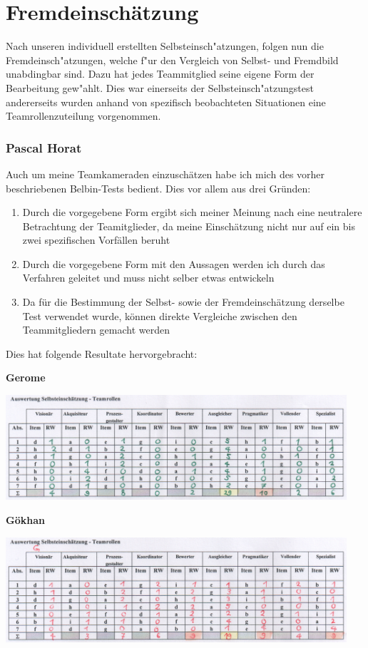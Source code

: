 
\chapter{Fremdeinschätzung}
Nach unseren individuell erstellten Selbsteinsch"atzungen, folgen nun die Fremdeinsch"atzungen, welche f"ur
den Vergleich von Selbst- und Fremdbild unabdingbar sind.
Dazu hat jedes Teammitglied seine eigene Form der Bearbeitung gew"ahlt. Dies war einerseits der Selbsteinsch"atzungstest andererseits wurden anhand von spezifisch beobachteten Situationen eine Teamrollenzuteilung
vorgenommen.
\subsection*{Pascal Horat}

Auch um meine Teamkameraden einzuschätzen habe ich mich des vorher beschriebenen Belbin-Tests bedient. Dies vor allem aus drei Gründen:
\begin{enumerate}
\item Durch die vorgegebene Form ergibt sich meiner Meinung nach eine neutralere Betrachtung der Teamitglieder, da meine Einschätzung nicht nur auf ein bis zwei spezifischen Vorfällen beruht
\item Durch die vorgegebene Form mit den Aussagen werden ich durch das Verfahren geleitet und muss nicht selber etwas entwickeln
\item Da für die Bestimmung der Selbst- sowie der Fremdeinschätzung derselbe Test verwendet wurde, können direkte Vergleiche zwischen den Teammitgliedern gemacht werden
\end{enumerate}

Dies hat folgende Resultate hervorgebracht:

\textbf{Gerome}

\includegraphics[height=39mm]{images/FremdeinschaetzungHoratKamga.png}

\textbf{Gökhan}

\includegraphics[height=39mm]{images/FremdeinschaetzungHoratKaya.png}

